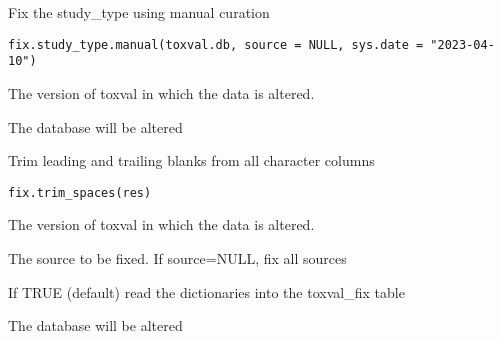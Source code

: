 \documentclass[letterpaper]{book}
\begin{document}
%
\begin{Description}\relax
Fix the study\_type using manual curation
\end{Description}
%
\begin{Usage}
\begin{verbatim}
fix.study_type.manual(toxval.db, source = NULL, sys.date = "2023-04-10")
\end{verbatim}
\end{Usage}
%
\begin{Arguments}
\begin{ldescription}
\item[\code{toxval.db}] The version of toxval in which the data is altered.
\end{ldescription}
\end{Arguments}
%
\begin{Value}
The database will be altered
\end{Value}
%
\begin{Description}\relax
Trim leading and trailing blanks from all character columns
\end{Description}
%
\begin{Usage}
\begin{verbatim}
fix.trim_spaces(res)
\end{verbatim}
\end{Usage}
%
\begin{Arguments}
\begin{ldescription}
\item[\code{toxval.db}] The version of toxval in which the data is altered.

\item[\code{source}] The source to be fixed. If source=NULL, fix all sources

\item[\code{fill.toxval\_fix}] If TRUE (default) read the dictionaries into the toxval\_fix table
\end{ldescription}
\end{Arguments}
%
\begin{Value}
The database will be altered
\end{Value}
%
\end{document}
